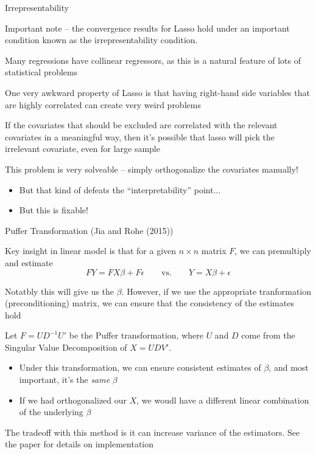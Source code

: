 \documentclass[notes,11pt, aspectratio=169]{beamer}
\newenvironment{wideitemize}{\itemize\addtolength{\itemsep}{10pt}}{\enditemize}
\begin{document}
\begin{frame}{Irrepresentability}
  \begin{wideitemize}
  \item Important note -- the convergence results for Lasso hold under
    an important condition known as the irrepresentability condition.
  \item Many regressions have collinear regressors, as this is a
    natural feature of lots of statistical problems
  \item One very awkward property of Lasso is that having right-hand
    side variables that are highly correlated can create very weird
    problems
  \item If the covariates that should be excluded are correlated with
    the relevant covariates in a meaningful way, then it's possible
    that lasso will pick the irrelevant covariate, even for large
    sample
  \item This problem is very solveable -- simply orthogonalize the covariates manually!
    \begin{itemize}
    \item But that kind of defeats the ``interpretability'' point...
    \item But this is fixable!
    \end{itemize}
  \end{wideitemize}
\end{frame}

\begin{frame}{Puffer Transformation (Jia and Rohe (2015))}
  \begin{wideitemize}
  \item Key insight in linear model is that for a given $n \times n$ matrix $F$, we can premultiply and estimate
    $$FY = FX\beta + F\epsilon \qquad \text{vs.} \qquad Y = X\beta + \epsilon  $$
  \item Notatbly this will give us the $\beta$. However, if we use the
    appropriate tranformation (preconditioning) matrix, we can ensure
    that the consistency of the estimates hold
  \item Let $F = UD^{-1}U'$ be the Puffer transformation, where $U$
    and $D$ come from the Singular Value Decomposition of $X = UDV'$.
    \begin{itemize}
    \item Under this transformation, we can ensure consistent
      estimates of $\beta$, and most important, it's the \emph{same} $\beta$
    \item If we had orthogonalized our $X$, we woudl have a different
      linear combination of the underlying $\beta$
    \end{itemize}
  \item The tradeoff with this method is it can increase variance of
    the estimators. See the paper for details on implementation
  \end{wideitemize}
\end{frame}
\end{document}

